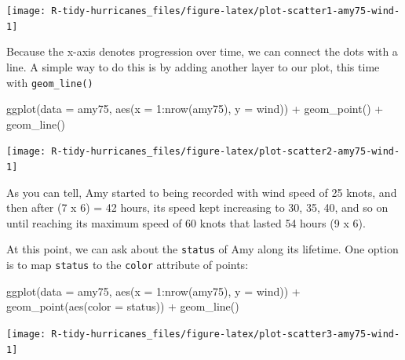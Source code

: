 \documentclass[
]{book}
\newenvironment{Shaded}{\begin{snugshade}}{\end{snugshade}}
\newcommand{\AttributeTok}[1]{\textcolor[rgb]{0.77,0.63,0.00}{#1}}
\newcommand{\DecValTok}[1]{\textcolor[rgb]{0.00,0.00,0.81}{#1}}
\newcommand{\FunctionTok}[1]{\textcolor[rgb]{0.00,0.00,0.00}{#1}}
\newcommand{\NormalTok}[1]{#1}
\newcommand{\SpecialCharTok}[1]{\textcolor[rgb]{0.00,0.00,0.00}{#1}}
\begin{document}
\begin{center}\texttt{[image: R-tidy-hurricanes\_files/figure-latex/plot-scatter1-amy75-wind-1]} \end{center}

Because the x-axis denotes progression over time, we can connect the dots
with a line. A simple way to do this is by adding another layer to our plot,
this time with \texttt{geom\_line()}

\begin{Shaded}
\begin{Highlighting}[]
\FunctionTok{ggplot}\NormalTok{(}\AttributeTok{data =}\NormalTok{ amy75, }\FunctionTok{aes}\NormalTok{(}\AttributeTok{x =} \DecValTok{1}\SpecialCharTok{:}\FunctionTok{nrow}\NormalTok{(amy75), }\AttributeTok{y =}\NormalTok{ wind)) }\SpecialCharTok{+}
  \FunctionTok{geom\_point}\NormalTok{() }\SpecialCharTok{+} 
  \FunctionTok{geom\_line}\NormalTok{()}
\end{Highlighting}
\end{Shaded}

\begin{center}\texttt{[image: R-tidy-hurricanes\_files/figure-latex/plot-scatter2-amy75-wind-1]} \end{center}

As you can tell, Amy started to being recorded with wind speed of 25 knots, and
then after (7 x 6) = 42 hours, its speed kept increasing to 30, 35, 40, and so on
until reaching its maximum speed of 60 knots that lasted 54 hours (9 x 6).

At this point, we can ask about the \texttt{status} of Amy along its lifetime. One
option is to map \texttt{status} to the \texttt{color} attribute of points:

\begin{Shaded}
\begin{Highlighting}[]
\FunctionTok{ggplot}\NormalTok{(}\AttributeTok{data =}\NormalTok{ amy75, }\FunctionTok{aes}\NormalTok{(}\AttributeTok{x =} \DecValTok{1}\SpecialCharTok{:}\FunctionTok{nrow}\NormalTok{(amy75), }\AttributeTok{y =}\NormalTok{ wind)) }\SpecialCharTok{+}
  \FunctionTok{geom\_point}\NormalTok{(}\FunctionTok{aes}\NormalTok{(}\AttributeTok{color =}\NormalTok{ status)) }\SpecialCharTok{+} 
  \FunctionTok{geom\_line}\NormalTok{()}
\end{Highlighting}
\end{Shaded}

\begin{center}\texttt{[image: R-tidy-hurricanes\_files/figure-latex/plot-scatter3-amy75-wind-1]} \end{center}
\end{document}

